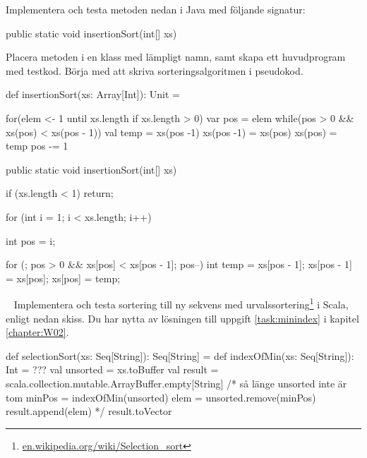 \Subtask Implementera och testa metoden nedan i Java med följande signatur:
\begin{Code}[language=Java]
  public static void insertionSort(int[] xs)
\end{Code}
Placera metoden i en klass med lämpligt namn, samt skapa ett huvudprogram med testkod. Börja med att skriva sorteringsalgoritmen i pseudokod.

\SOLUTION


\TaskSolved \what


\SubtaskSolved

\begin{Code}
def insertionSort(xs: Array[Int]): Unit = {

  for(elem <- 1 until xs.length if xs.length > 0){
    var pos = elem
    while(pos > 0 && xs(pos) < xs(pos - 1)){
      val temp = xs(pos -1)
      xs(pos -1) = xs(pos)
      xs(pos) = temp
      pos -= 1
    }
  }
}
\end{Code}

\SubtaskSolved

\begin{Code}[language=Java]
public static void insertionSort(int[] xs) {

    if (xs.length < 1)
        return;

    for (int i = 1; i < xs.length; i++) {
        int pos = i;

        for (; pos > 0 && xs[pos] < xs[pos - 1]; pos--) {
            int temp = xs[pos - 1];
            xs[pos - 1] = xs[pos];
            xs[pos] = temp;
        }
    }
}
\end{Code}



\QUESTEND



\clearpage

\AdvancedTasks



\QUESTBEGIN

\Task  \what~ Implementera och testa sortering till ny sekvens med urvalssortering\footnote{\href{https://en.wikipedia.org/wiki/Selection_sort}{en.wikipedia.org/wiki/Selection\_sort}} i Scala, enligt nedan skiss.  Du har nytta av lösningen till uppgift \ref{task:minindex} i kapitel \ref{chapter:W02}.
\begin{Code}
def selectionSort(xs: Seq[String]): Seq[String] = {
  def indexOfMin(xs: Seq[String]): Int = ???
  val unsorted = xs.toBuffer
  val result = scala.collection.mutable.ArrayBuffer.empty[String]
  /*
  så länge unsorted inte är tom {
    minPos = indexOfMin(unsorted)
    elem   = unsorted.remove(minPos)
    result.append(elem)
  }
  */
  result.toVector
}
\end{Code}



